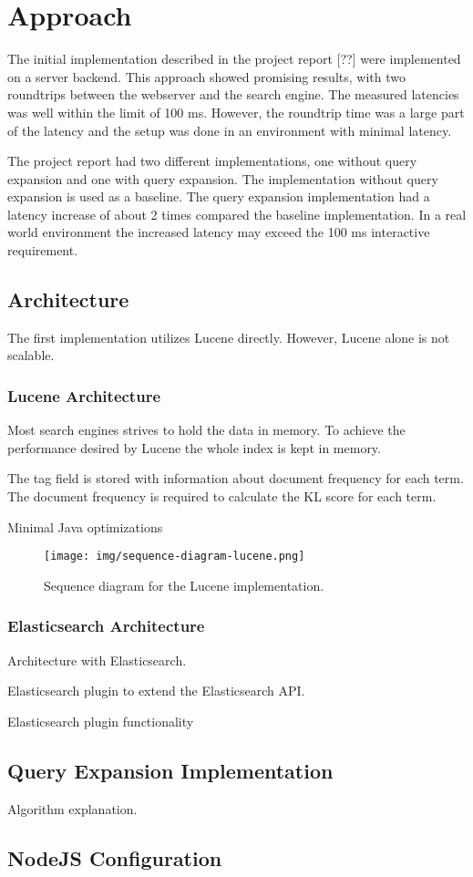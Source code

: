 \chapter{Approach}
\label{ch:approach}
The initial implementation described in the project report [??] were implemented on a server backend.
This approach showed promising results, with two roundtrips between the webserver and the search engine.
The measured latencies was well within the limit of 100 ms.
However, the roundtrip time was a large part of the latency and the setup was done in an environment with minimal latency.

The project report had two different implementations, one without query expansion and one with query expansion.
The implementation without query expansion is used as a baseline.
The query expansion implementation had a latency increase of about 2 times compared the baseline implementation.
In a real world environment the increased latency may exceed the 100 ms interactive requirement.

\section{Architecture}
The first implementation utilizes Lucene directly.
However, Lucene alone is not scalable.

\subsection{Lucene Architecture}
Most search engines strives to hold the data in memory.
To achieve the performance desired by Lucene the whole index is kept in memory.

The tag field is stored with information about document frequency for each term.
The document frequency is required to calculate the KL score for each term.

Minimal Java optimizations

\begin{figure}[h!]
\centering \texttt{[image: img/sequence-diagram-lucene.png]}
\caption{Sequence diagram for the Lucene implementation.}
\label{fig:sequence-diagram-lucene}
\end{figure}

\subsection{Elasticsearch Architecture}
Architecture with Elasticsearch.

Elasticsearch plugin to extend the Elasticsearch API.

Elasticsearch plugin functionality

\section{Query Expansion Implementation}
Algorithm explanation.

\section{NodeJS Configuration}

